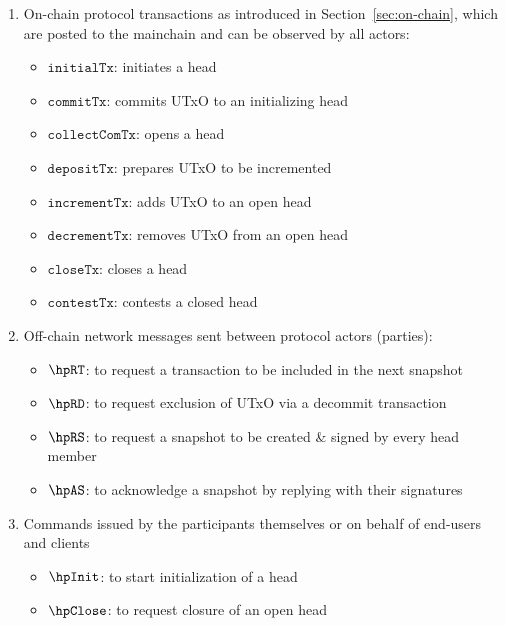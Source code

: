 \begin{enumerate}
  \item On-chain protocol transactions as introduced in
  Section~\ref{sec:on-chain}, which are posted to the mainchain and can be
  observed by all actors:
  \begin{itemize}
    \item $\mathtt{initialTx}$: initiates a head
    \item $\mathtt{commitTx}$: commits UTxO to an initializing head
    \item $\mathtt{collectComTx}$: opens a head
    \item $\mathtt{depositTx}$: prepares UTxO to be incremented
    \item $\mathtt{incrementTx}$: adds UTxO to an open head
    \item $\mathtt{decrementTx}$: removes UTxO from an open head
    \item $\mathtt{closeTx}$: closes a head
    \item $\mathtt{contestTx}$: contests a closed head
  \end{itemize}
  \item Off-chain network messages sent between protocol actors (parties):
  \begin{itemize}
    \item $\hpRT$: to request a transaction to be included in the next snapshot
    \item $\hpRD$: to request exclusion of UTxO via a decommit transaction
    \item $\hpRS$: to request a snapshot to be created \& signed by every head member
    \item $\hpAS$: to acknowledge a snapshot by replying with their signatures
  \end{itemize}
  \item Commands issued by the participants themselves or on behalf of end-users and clients
  \begin{itemize}
    \item $\hpInit$: to start initialization of a head
    \item $\hpClose$: to request closure of an open head
  \end{itemize}
\end{enumerate}



